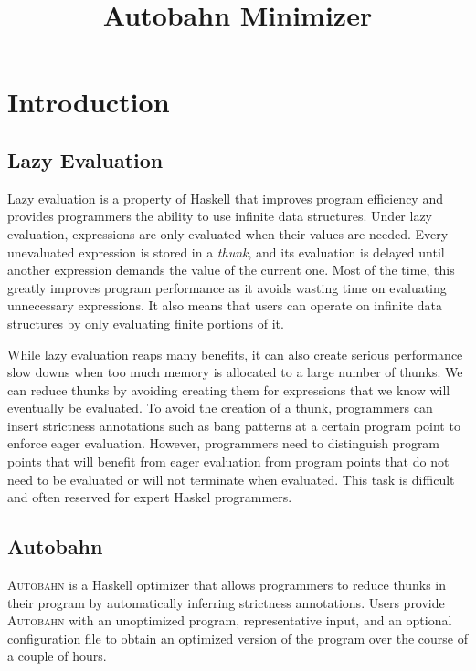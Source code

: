 \documentclass[format=sigplan]{acmart}
\begin{document}
\title{Autobahn Minimizer}
\maketitle

\begin{abstract}
\end{abstract}

\section{Introduction}

\subsection{Lazy Evaluation}

Lazy evaluation is a property of Haskell that improves program efficiency and provides programmers the ability to use infinite data structures. Under lazy evaluation, expressions are only evaluated when their values are needed. Every unevaluated expression is stored in a \textit{thunk}, and its evaluation is delayed until another expression demands the value of the current one. Most of the time, this greatly improves program performance as it avoids wasting time on evaluating unnecessary expressions. It also means that users can operate on infinite data structures by only evaluating finite portions of it.

While lazy evaluation reaps many benefits, it can also create serious performance slow downs when too much memory is allocated to a large number of thunks. We can reduce thunks by avoiding creating them for expressions that we know will eventually be evaluated. To avoid the creation of a thunk, programmers can insert strictness annotations such as bang patterns at a certain program point to enforce eager evaluation. However, programmers need to distinguish program points that will benefit from eager evaluation from program points that do not need to be evaluated or will not terminate when evaluated. This task is difficult and often reserved for expert Haskel programmers. 

\subsection{Autobahn}

\textsc{Autobahn} is a Haskell optimizer that allows programmers to reduce thunks in their program by automatically inferring strictness annotations. Users provide \textsc{Autobahn} with an unoptimized program, representative input, and an optional configuration file to obtain an optimized version of the program over the course of a couple of hours. 
\end{document}
